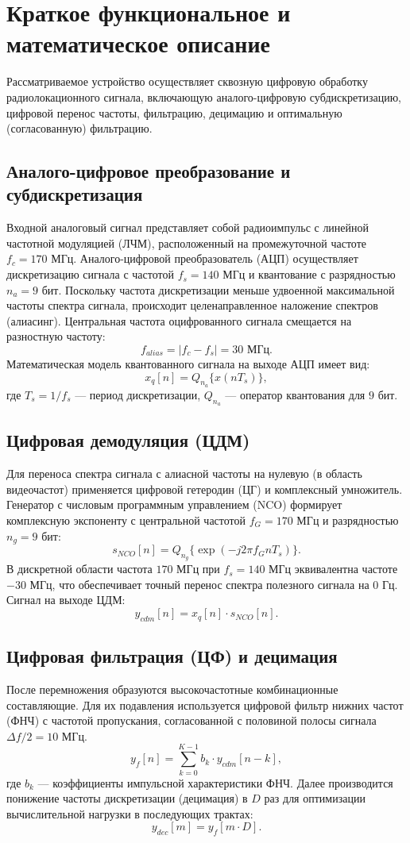 \section{Краткое функциональное и математическое описание}

Рассматриваемое устройство осуществляет сквозную цифровую обработку радиолокационного сигнала, включающую аналого-цифровую субдискретизацию, цифровой перенос частоты, фильтрацию, децимацию и оптимальную (согласованную) фильтрацию.

\subsection{Аналого-цифровое преобразование и субдискретизация}
Входной аналоговый сигнал представляет собой радиоимпульс с линейной частотной модуляцией (ЛЧМ), расположенный на промежуточной частоте $f_c = 170$ МГц. Аналого-цифровой преобразователь (АЦП) осуществляет дискретизацию сигнала с частотой $f_s = 140$ МГц и квантование с разрядностью $n_a = 9$ бит. Поскольку частота дискретизации меньше удвоенной максимальной частоты спектра сигнала, происходит целенаправленное наложение спектров (алиасинг). Центральная частота оцифрованного сигнала смещается на разностную частоту:
$$ f_{alias} = |f_c - f_s| = 30 \text{ МГц}. $$
Математическая модель квантованного сигнала на выходе АЦП имеет вид:
$$ x_q[n] = Q_{n_a} \{ x(n T_s) \}, $$
где $T_s = 1/f_s$ --- период дискретизации, $Q_{n_a}$ --- оператор квантования для $9$ бит.

\subsection{Цифровая демодуляция (ЦДМ)}
Для переноса спектра сигнала с алиасной частоты на нулевую (в область видеочастот) применяется цифровой гетеродин (ЦГ) и комплексный умножитель. Генератор с числовым программным управлением (NCO) формирует комплексную экспоненту с центральной частотой $f_G = 170$ МГц и разрядностью $n_g = 9$ бит:
$$ s_{NCO}[n] = Q_{n_g} \{ \exp(-j 2\pi f_G n T_s) \}. $$
В дискретной области частота $170$ МГц при $f_s = 140$ МГц эквивалентна частоте $-30$ МГц, что обеспечивает точный перенос спектра полезного сигнала на $0$ Гц. Сигнал на выходе ЦДМ:
$$ y_{cdm}[n] = x_q[n] \cdot s_{NCO}[n]. $$

\subsection{Цифровая фильтрация (ЦФ) и децимация}
После перемножения образуются высокочастотные комбинационные составляющие. Для их подавления используется цифровой фильтр нижних частот (ФНЧ) с частотой пропускания, согласованной с половиной полосы сигнала $\Delta f / 2 = 10$ МГц.
$$ y_{f}[n] = \sum_{k=0}^{K-1} b_k \cdot y_{cdm}[n-k], $$
где $b_k$ --- коэффициенты импульсной характеристики ФНЧ.
Далее производится понижение частоты дискретизации (децимация) в $D$ раз для оптимизации вычислительной нагрузки в последующих трактах:
\begin{equation}
    y_{dec}[m] = y_f[m \cdot D].
\end{equation}

